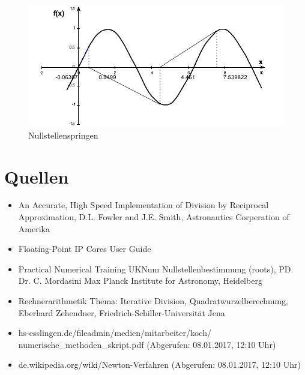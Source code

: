 \documentclass[a4paper,12pt,fleqn,oneside]{article}
\begin{document}
		\begin{figure}
			\centering
			\includegraphics[width=0.5\linewidth]{hupfen.png}
			\caption{Nullstellenspringen}
			\label{fig:hupfen}
		\end{figure}



\newpage

\section{Quellen}
	\begin{itemize}
		\item An Accurate, High Speed Implementation of Division by Reciprocal Approximation, D.L. Fowler and J.E. Smith, Astronautics Corperation of
			Amerika
		\item Floating-Point IP Cores User Guide
		\item Practical Numerical Training UKNum Nullstellenbestimmung (roots), PD. Dr. C. Mordasini Max Planck Institute for Astronomy, Heidelberg
		\item Rechnerarithmetik Thema: Iterative Division, Quadratwurzelberechnung, Eberhard Zehendner, Friedrich-Schiller-Universität Jena
		\item hs-esslingen.de/fileadmin/medien/mitarbeiter/koch/\\numerische\_methoden\_skript.pdf (Abgerufen: 08.01.2017, 12:10 Uhr)
		\item de.wikipedia.org/wiki/Newton-Verfahren (Abgerufen: 08.01.2017, 12:10 Uhr)
	\end{itemize}





	
\end{document}
